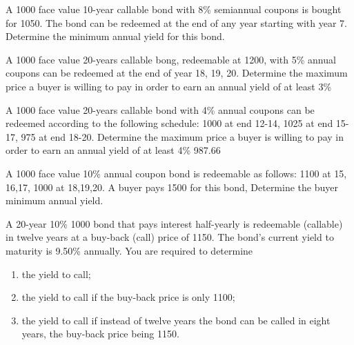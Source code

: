 \documentclass[12pt,a4paper]{article}
\begin{document}
\begin{question} A 1000 face value 10-year callable bond with 8\% semiannual coupons is bought for 1050.  The bond can be redeemed at the end of any year starting with year 7.  Determine the minimum annual yield for this bond.
\end{question}

\begin{question} A 1000 face value 20-years callable bong, redeemable at 1200, with 5\% annual coupons can be redeemed at the end of year 18, 19, 20. Determine the maximum price a buyer is willing to pay in order to earn an annual yield of at least 3\%
\end{question}

\begin{question} A 1000 face value 20-years callable bond with 4\% annual coupons can be redeemed according to the following schedule:
1000 at end 12-14, 1025 at end 15-17, 975 at end 18-20.
Determine the maximum price a buyer is willing to pay in order to earn an annual yield of at least 4\%
987.66
\end{question}

\begin{question} A 1000 face value 10\% annual coupon bond is redeemable as follows: 1100 at 15, 16,17, 1000 at 18,19,20. A buyer pays 1500 for this bond, Determine the buyer minimum annual yield.
\end{question}

\begin{question} A 20-year 10\% 1000 bond that pays interest half-yearly is redeemable (callable) in twelve years at a buy-back (call) price of 1150. The bond's current yield to maturity is 9.50\% annually. You are required to determine 
\begin{enumerate}[label=(\alph*),font=\itshape]
	\item the yield to call;
	\item the yield to call if the buy-back price is only 1100;
	\item the yield to call if instead of twelve years the bond can be called in eight years, the buy-back price being 1150.
\end{enumerate}
\end{question}
\end{document}
